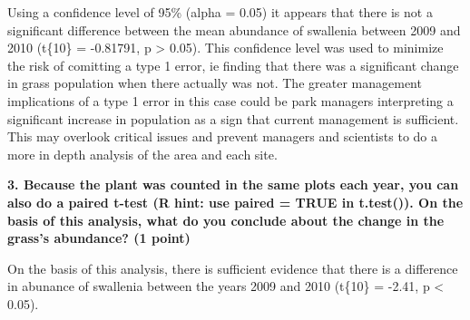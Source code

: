\documentclass[]{article}
\newenvironment{Shaded}{\begin{snugshade}}{\end{snugshade}}
\newcommand{\KeywordTok}[1]{\textcolor[rgb]{0.13,0.29,0.53}{\textbf{#1}}}
\newcommand{\DataTypeTok}[1]{\textcolor[rgb]{0.13,0.29,0.53}{#1}}
\newcommand{\DecValTok}[1]{\textcolor[rgb]{0.00,0.00,0.81}{#1}}
\newcommand{\FloatTok}[1]{\textcolor[rgb]{0.00,0.00,0.81}{#1}}
\newcommand{\StringTok}[1]{\textcolor[rgb]{0.31,0.60,0.02}{#1}}
\newcommand{\CommentTok}[1]{\textcolor[rgb]{0.56,0.35,0.01}{\textit{#1}}}
\newcommand{\OtherTok}[1]{\textcolor[rgb]{0.56,0.35,0.01}{#1}}
\newcommand{\OperatorTok}[1]{\textcolor[rgb]{0.81,0.36,0.00}{\textbf{#1}}}
\newcommand{\NormalTok}[1]{#1}
\begin{document}
\begin{Shaded}
\end{Shaded}

Using a confidence level of 95\% (alpha = 0.05) it appears that there is
not a significant difference between the mean abundance of swallenia
between 2009 and 2010 (t\{10\} = -0.81791, p \textgreater{} 0.05). This
confidence level was used to minimize the risk of comitting a type 1
error, ie finding that there was a significant change in grass
population when there actually was not. The greater management
implications of a type 1 error in this case could be park managers
interpreting a significant increase in population as a sign that current
management is sufficient. This may overlook critical issues and prevent
managers and scientists to do a more in depth analysis of the area and
each site.

\textbf{3. Because the plant was counted in the same plots each year,
you can also do a paired t-test (R hint: use paired = TRUE in t.test()).
On the basis of this analysis, what do you conclude about the change in
the grass's abundance? (1 point)}

\begin{Shaded}
\end{Shaded}

On the basis of this analysis, there is sufficient evidence that there
is a difference in abunance of swallenia between the years 2009 and 2010
(t\{10\} = -2.41, p \textless{} 0.05).
\end{document}
